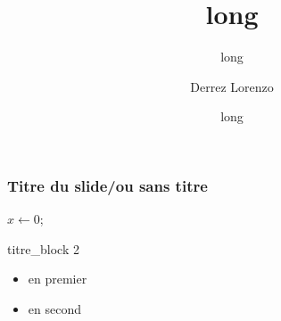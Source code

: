 \documentclass{beamer}
\title[court]{long}
\subtitle{long}
\author{Derrez Lorenzo}
\date[court]{long}
\institute[court]{long}
\begin{document}
\maketitle

\begin{frame} %
\frametitle{Titre du slide/ou sans titre}

\begin{algorithm}[H]
    \caption{Test implémentation algo}
    \begin{algorithmic}
            \State $ x \leftarrow 0 $;
        \EndFunction
    \end{algorithmic}
\end{algorithm}

\end{frame}

\begin{frame}
    \begin{block}{titre_block 2}
        \begin{itemize}
            \item en premier
            \item en second
        \end{itemize}
    \end{block}

\end{frame}
\end{document}
